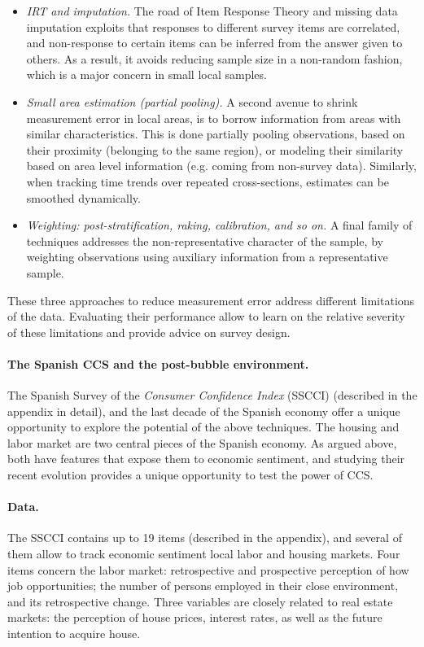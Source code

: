 \documentclass[12pt]{article}
\begin{document}
\begin{itemize}
\item \emph{IRT and imputation.} The road of Item Response Theory and missing data imputation exploits that responses to different survey items are correlated, and non-response to certain items can be inferred from the answer given to others. As a result, it avoids reducing sample size in a non-random fashion, which is a major concern in small local samples. 
\item \emph{Small area estimation (partial pooling).} A second avenue to shrink measurement error in local areas, is to borrow information from areas with similar characteristics. This is done partially pooling observations, based on their proximity (belonging to the same region), or modeling their similarity based  on area level information (e.g. coming from non-survey data). Similarly, when tracking time trends over repeated cross-sections, estimates can be smoothed dynamically.
\item \emph{Weighting: post-stratification, raking, calibration, and so on.} A final family of techniques addresses the non-representative character of the sample, by weighting observations using auxiliary information from a representative sample.
\end{itemize}

These three approaches to reduce measurement error address different limitations of the data. Evaluating their performance allow to learn on the relative severity of these limitations and provide advice on survey design. 

\paragraph{The Spanish CCS and the post-bubble environment.} The Spanish Survey of the \textit{Consumer Confidence Index} (SSCCI) (described in the appendix in detail), and the last decade of the Spanish economy offer a unique opportunity to explore the potential of the above techniques. The housing and labor market are two central pieces of the Spanish economy. As argued above, both have features that expose them to economic sentiment, and studying their recent evolution provides a unique opportunity to test the power of CCS. 



\paragraph{Data.} The SSCCI contains up to 19 items (described in the appendix), and several of them allow to track economic sentiment local labor and housing markets. Four items concern the labor market: retrospective and prospective perception of how job opportunities; the number of persons employed in their close environment, and its retrospective change. Three variables are closely related to real estate markets: the perception of house prices, interest rates, as well as the future intention to acquire house. 
\end{document}
